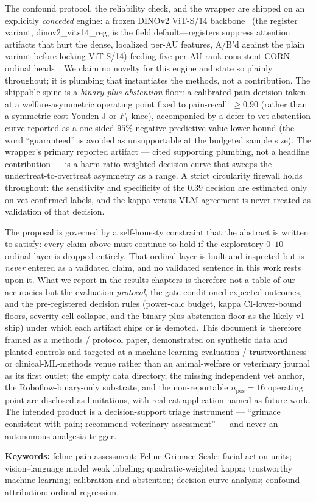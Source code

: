 The confound protocol, the reliability check, and the wrapper are shipped on an
explicitly \emph{conceded} engine: a frozen
DINOv2 ViT-S/14 backbone~\cite{oquab2023dinov2} (the register variant,
dinov2\_vits14\_reg, is the field default---registers suppress attention
artifacts that hurt the dense, localized per-AU features, A/B'd against the
plain variant before locking ViT-S/14) feeding five per-AU
rank-consistent CORN ordinal heads~\cite{shi2023corn}. We claim no novelty for
this engine and state so plainly throughout; it is plumbing that instantiates
the methods, not a contribution. The shippable spine is a
\emph{binary-plus-abstention} floor: a calibrated pain decision taken at a
welfare-asymmetric operating point fixed to pain-recall~$\geq 0.90$ (rather than
a symmetric-cost Youden-J or $F_1$ knee), accompanied by a defer-to-vet
abstention curve reported as a one-sided $95\%$ negative-predictive-value lower
bound (the word ``guaranteed'' is avoided as unsupportable at the budgeted
sample size). The wrapper's primary reported artifact --- cited supporting plumbing,
not a headline contribution --- is a harm-ratio-weighted decision curve that
sweeps the undertreat-to-overtreat asymmetry as a range. A strict circularity firewall holds throughout: the
sensitivity and specificity of the $0.39$ decision are estimated only on
vet-confirmed labels, and the kappa-versus-VLM agreement is never treated as
validation of that decision.

The proposal is governed by a self-honesty constraint that the abstract is
written to satisfy: every claim above must continue to hold if the exploratory
$0$--$10$ ordinal layer is dropped entirely. That ordinal layer is built and
inspected but is \emph{never} entered as a validated claim, and no validated
sentence in this work rests upon it. What we report in the results chapters is
therefore not a table of our accuracies but the evaluation \emph{protocol}, the
gate-conditioned expected outcomes, and the pre-registered decision rules
(power-calc budget, kappa CI-lower-bound floors, severity-cell collapse, and
the binary-plus-abstention floor as the likely v1 ship) under which each artifact ships or is demoted. This
document is therefore framed as a methods / protocol paper, demonstrated on
synthetic data and planted controls and targeted at a machine-learning
evaluation / trustworthiness or clinical-ML-methods venue rather than an
animal-welfare or veterinary journal as its first outlet; the empty data
directory, the missing independent vet anchor, the Roboflow-binary-only
substrate, and the non-reportable $n_{\text{pos}}=16$ operating point are
disclosed as limitations, with real-cat application named as future work. The
intended product is a decision-support triage instrument --- ``grimace
consistent with pain; recommend veterinary assessment'' --- and never an
autonomous analgesia trigger.

\vspace{1em}
\noindent\textbf{Keywords:} feline pain assessment; Feline Grimace Scale;
facial action units; vision--language model weak labeling; quadratic-weighted
kappa; trustworthy machine learning; calibration and abstention; decision-curve
analysis; confound attribution; ordinal regression.
